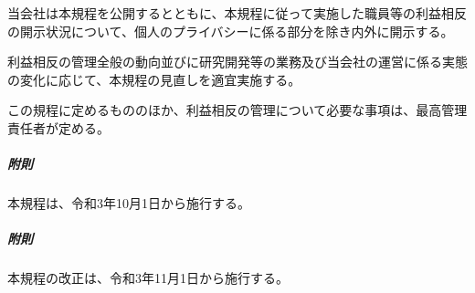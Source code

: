 \documentclass[10pt,a4paper,uplatex]{jsarticle}
\begin{document}
当会社は本規程を公開するとともに、本規程に従って実施した職員等の利益相反の開示状況について、個人のプライバシーに係る部分を除き内外に開示する。

利益相反の管理全般の動向並びに研究開発等の業務及び当会社の運営に係る実態の変化に応じて、本規程の見直しを適宜実施する。

この規程に定めるもののほか、利益相反の管理について必要な事項は、最高管理責任者が定める。

\vspace{1cm}
\subparagraph{附則} 本規程は、令和3年10月1日から施行する。
\subparagraph{附則} 本規程の改正は、令和3年11月1日から施行する。
\end{document}
